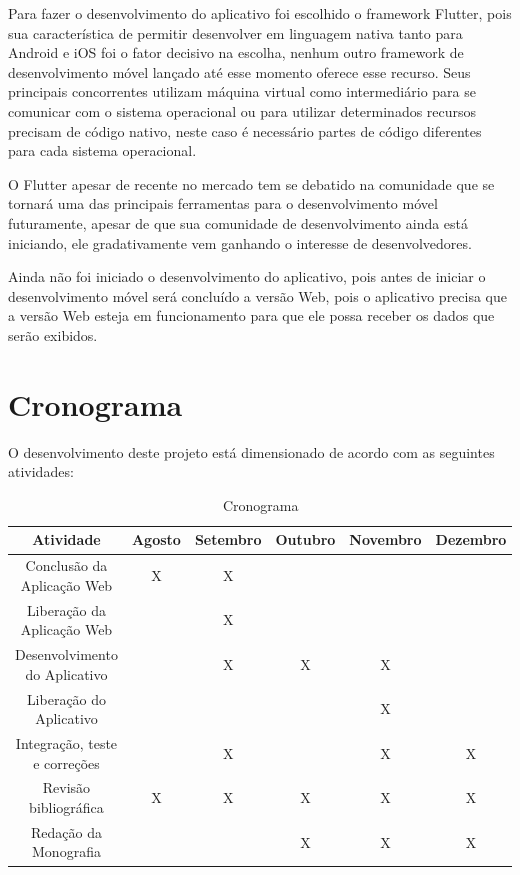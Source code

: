 \documentclass{ifto-tex}
\begin{document}
Para fazer o desenvolvimento do aplicativo foi escolhido o framework Flutter, pois sua característica de permitir desenvolver em linguagem nativa tanto para Android e iOS foi o fator decisivo na escolha, nenhum outro framework de desenvolvimento móvel lançado até esse momento oferece esse recurso. Seus principais concorrentes utilizam máquina virtual como intermediário para se comunicar com o sistema operacional ou para utilizar determinados recursos precisam de código nativo, neste caso é necessário partes de código diferentes para cada sistema operacional.

O Flutter apesar de recente no mercado tem se debatido na comunidade que se tornará uma das principais ferramentas para o desenvolvimento móvel futuramente, apesar de que sua comunidade de desenvolvimento ainda está iniciando, ele gradativamente vem ganhando o interesse de desenvolvedores.

Ainda não foi iniciado o desenvolvimento do aplicativo, pois antes de iniciar o desenvolvimento móvel será concluído a versão Web, pois o aplicativo precisa que a versão Web esteja em funcionamento para que ele possa receber os dados que serão exibidos.

\chapter{Cronograma}
O desenvolvimento deste projeto está dimensionado de acordo com as seguintes atividades:
\begin{table}[h]
	\begin{tabular}{|c|c|c|c|c|c|}
		\hline
		Atividade                             & Agosto & Setembro & Outubro & Novembro & Dezembro \\
		\hline
		Conclusão da Aplicação Web            & X      & X        &         &          &          \\
		\hline
		Liberação da Aplicação Web &        & X        &         &          &          \\
		\hline
		Desenvolvimento do Aplicativo          &        & X        & X       & X        &          \\
		\hline
		Liberação do Aplicativo &        &          &         & X        &          \\
		\hline
		Integração, teste e correções         &        & X        &         & X        & X        \\
		\hline
		Revisão bibliográfica                 & X      & X        & X       & X        & X        \\
		\hline
		Redação da Monografia                 &        &          & X       & X        & X       \\
		\hline
	\end{tabular}
\caption{Cronograma}
\end{table}
\end{document}
